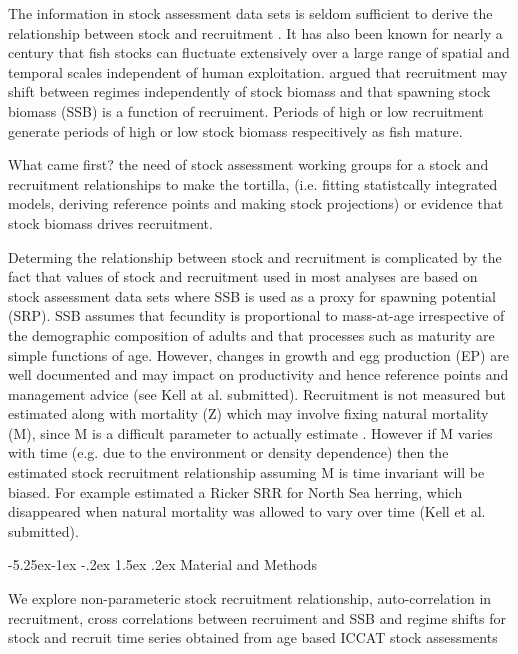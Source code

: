 \documentclass[a4paper, 10pt]{article}
\makeatletter
\renewcommand{\section}{\@startsection{section}{1}{\z@}%
  {-5.25ex\@plus -1ex \@minus -.2ex}%
  {1.5ex \@plus .2ex}%
  {\normalfont\bfseries}}
\makeatother
\begin{document}
The information in stock assessment data sets is seldom sufficient to derive the relationship between stock 
and recruitment \cite{lee2012steepness}. It has also been known for nearly a century 
\citep{hjort_fluctuations_1926} that fish stocks can fluctuate extensively over a large range  of spatial and temporal 
scales independent of human exploitation. \cite{gilbert_towards_1997} argued that recruitment may shift between 
regimes independently of stock biomass and that spawning stock biomass (SSB) is a function of recruiment. 
Periods of high or low recruitment generate periods of high or low stock biomass respecitively as fish mature. 

What came first? the need of stock assessment working groups for a stock and recruitment relationships to make 
the tortilla, (i.e. fitting  statistcally integrated models, deriving reference points and making stock projections) or 
evidence that stock biomass drives recruitment. 

Determing the relationship between stock and recruitment is complicated by the fact that values of stock and recruitment 
used in most analyses are based on stock assessment data sets where SSB is used as a 
proxy for spawning  potential (SRP). SSB assumes that fecundity is proportional to mass-at-age irrespective of the demographic 
composition of adults and that processes such as maturity are simple functions of age. However, changes in growth and egg 
production (EP) are well documented and may impact on productivity and hence reference points and management advice 
(see Kell at al. submitted). Recruitment is not measured but estimated along with mortality (Z) which may
involve fixing natural mortality (M), since M is a difficult parameter to actually estimate \cite{lee2012steepness}.
However if M varies with time (e.g. due to the environment or density dependence) then the estimated stock
recruitment relationship assuming M is time invariant will be biased. For example \cite{nash2009stock} estimated a Ricker SRR 
for North Sea herring, which disappeared when natural mortality was allowed to vary over time (Kell et al. submitted).

\section{Material and Methods}

We explore non-parameteric stock recruitment relationship, auto-correlation in recruitment,
cross correlations between recruiment and SSB and regime shifts for stock and recruit time series
obtained from age based ICCAT stock assessments
\end{document}
